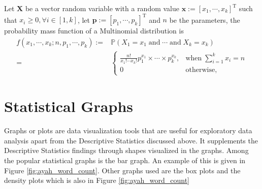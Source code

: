 \begin{defnx}
Let $\mathbf{X}$ be a vector random variable with a random value $\mathbf{x}:=[x_1,\cdots,x_k]^{\text{T}}$ such that $x_i\geq 0,\forall i \in[1,k]$, let $\boldsymbol{p}:=[p_1,\cdots,p_k]^{\text{T}}$ and $n$ be the parameters, the probability mass function of a Multinomial distribution is 
\begin{align}
    f(x_1,\cdots,x_k;n,p_1,\cdots,p_k):=&\mathbb{P}(X_1=x_1\;\text{and}\;\cdots\;\text{and}\;X_k=x_k)\nonumber\\
    =&\begin{cases}
        \displaystyle\frac{n!}{x_1!\cdots x_k!}p_1^{x_1}\times\cdots\times p_k^{x_k},&\text{when}\;\sum_{i=1}^kx_i=n\\
        0&\text{otherwise},
    \end{cases}
\end{align}
\end{defnx}
\section{Statistical Graphs}\label{sec:stat_graphs_method}
Graphs or plots are data visualization tools that are useful for exploratory data analysis apart from the Descriptive Statistics discussed above. It supplements the Descriptive Statistics findings through shapes visualized in the graphs. Among the popular statistical graphs is the bar graph. An example of this is given in Figure \ref{fig:ayah_word_count}. Other graphs used are the box plots and the density plots which is also in Figure \ref{fig:ayah_word_count}
